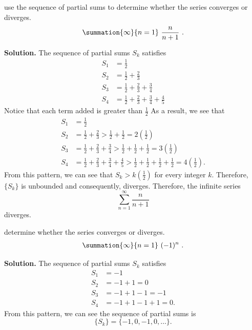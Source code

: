 \documentclass{report}
\begin{document}
  \pagebreak \bigbreak \noindent 
  \begin{eg}
     use the sequence of partial sums to determine whether the series converges or diverges.
     \begin{align*}
         \summation{\infty}{n=1}\ \frac{n}{n+1}\ 
     .\end{align*}
  \end{eg}
  \bigbreak \noindent 
    \textbf{Solution.}
  The sequence of partial sums \( S_k \) satisfies
    \begin{align*}
        S_1 & = \frac{1}{2} \\
        S_2 & = \frac{1}{2} + \frac{2}{3} \\
        S_3 & = \frac{1}{2} + \frac{2}{3} + \frac{3}{4} \\
        S_4 & = \frac{1}{2}+ \frac{2}{3} + \frac{3}{4}+ \frac{4}{5}
    \end{align*}
    Notice that each term added is greater than  $\frac{1}{2} $ As a result, we see that
    \begin{align*}
        S_1 & = \frac{1}{2} \\
        S_2 & = \frac{1}{2} + \frac{2}{3} > \frac{1}{2} + \frac{1}{2} = 2 \left( \frac{1}{2} \right) \\
        S_3 & = \frac{1}{2} + \frac{2}{3} + \frac{3}{4} > \frac{1}{2} + \frac{1}{2} + \frac{1}{2} = 3 \left( \frac{1}{2} \right) \\
        S_4 & = \frac{1}{2} + \frac{2}{3} + \frac{3}{4} + \frac{4}{5} > \frac{1}{2} + \frac{1}{2} + \frac{1}{2} + \frac{1}{2} = 4 \left( \frac{1}{2} \right).
    \end{align*}
    From this pattern, we can see that \( S_k > k \left( \frac{1}{2} \right) \) for every integer \( k \). Therefore, \( \{ S_k \} \) is unbounded and consequently, diverges. Therefore, the infinite series 
    \[
    \sum_{n=1}^{\infty} \frac{n}{n+1}
    \]
    diverges.

    \bigbreak \noindent 
    \begin{eg}
     determine whether the series converges or diverges. 
       \begin{align*}
           \summation{\infty}{n=1}\ (-1)^{n}\ 
       .\end{align*}
    \end{eg}
    \bigbreak \noindent 
    \textbf{Solution.}
    The sequence of partial sums \( S_k \) satisfies
    \begin{align*}
        S_1 & = -1 \\
        S_2 & = -1 + 1 = 0 \\
        S_3 & = -1 + 1 - 1 = -1 \\
        S_4 & = -1 + 1 - 1 + 1 = 0.
    \end{align*}
    From this pattern, we can see the sequence of partial sums is
    \[ \{ S_k \} = \{-1, 0, -1, 0, \ldots\}. \]
\end{document}

